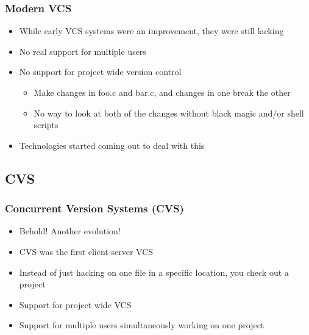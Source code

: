 \documentclass{beamer}
\begin{document}
\begin{frame}
  \frametitle{Modern VCS}
  \begin{itemize}
    \item While early VCS systems were an improvement, they were still lacking
    \item No real support for multiple users
    \item No support for project wide version control
      \begin{itemize}
	\item Make changes in foo.c and bar.c, and changes in one break the other
	\item No way to look at both of the changes without black magic and/or shell scripts
      \end{itemize}
    \item Technologies started coming out to deal with this 
  \end{itemize}
\end{frame}

\subsection{CVS}

\begin{frame}
  \frametitle{Concurrent Version Systems (CVS)}
  \begin{itemize}
    \item Behold! Another evolution!
    \item CVS was the first client-server VCS
    \item Instead of just hacking on one file in a specific location, you check out a project
    \item Support for project wide VCS
    \item Support for multiple users simultaneously working on one project
  \end{itemize}
\end{frame}
\end{document}
